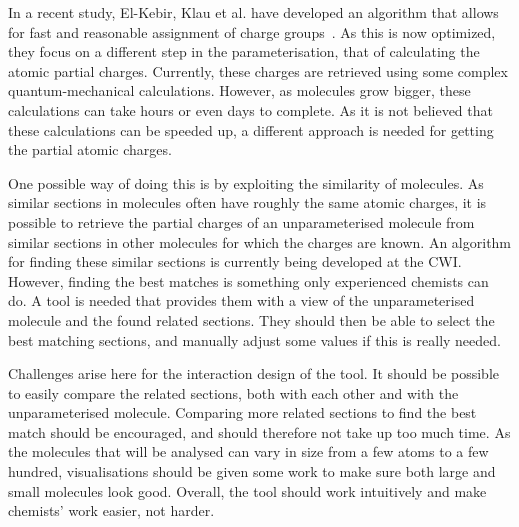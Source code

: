 In a recent study, El-Kebir, Klau et al. have developed an algorithm that allows for fast and reasonable assignment of charge groups~\cite{canzar2012charge}. As this is now optimized, they focus on a different step in the parameterisation, that of calculating the atomic partial charges. Currently, these charges are retrieved using some complex quantum-mechanical calculations. However, as molecules grow bigger, these calculations can take hours or even days to complete. As it is not believed that these calculations can be speeded up, a different approach is needed for getting the partial atomic charges.

One possible way of doing this is by exploiting the similarity of molecules. As similar sections in molecules often have roughly the same atomic charges, it is possible to retrieve the partial charges of an unparameterised molecule from similar sections in other molecules for which the charges are known. An algorithm for finding these similar sections is currently being developed at the CWI. However, finding the best matches is something only experienced chemists can do. A tool is needed that provides them with a view of the unparameterised molecule and the found related sections. They should then be able to select the best matching sections, and manually adjust some values if this is really needed.

Challenges arise here for the interaction design of the tool. It should be possible to easily compare the related sections, both with each other and with the unparameterised molecule. Comparing more related sections to find the best match should be encouraged, and should therefore not take up too much time. As the molecules that will be analysed can vary in size from a few atoms to a few hundred, visualisations should be given some work to make sure both large and small molecules look good. Overall, the tool should work intuitively and make chemists' work easier, not harder.
